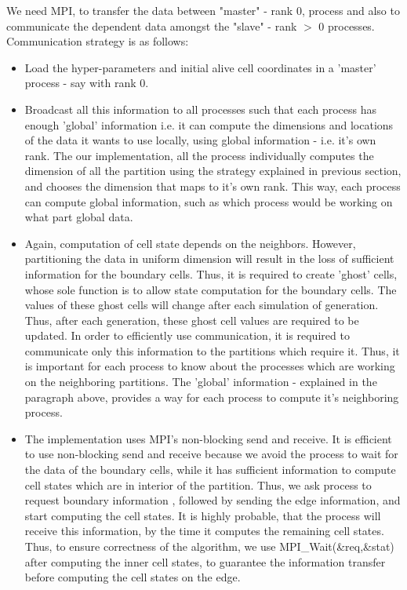 \documentclass[a4paper, 10pt, conference]{IEEEtran}      %
\begin{document}
	We need MPI, to transfer the data between "master" - rank 0, process and also to communicate the dependent data amongst the "slave" - rank $>$ 0 processes. Communication strategy is as follows:\\
	\begin{itemize}
		\item  Load the hyper-parameters and initial alive cell coordinates in a 'master' process - say with rank 0.\\
		\item Broadcast all this information to all processes such that each process has enough 'global' information i.e. it can compute the dimensions and locations of the data it wants to use locally, using global information - i.e. it's own rank.  The our implementation, all the process individually computes the dimension of all the partition using the strategy explained in previous section, and chooses the dimension that maps to it's own rank. This way, each process can compute global information, such as which process would be working on what part global data.\\
		\item Again, computation of cell state depends on the neighbors. However, partitioning the data in uniform dimension will result in the loss of sufficient information for the boundary cells. Thus, it is required to create 'ghost' cells, whose sole function is to allow state computation for the boundary cells. The values of these ghost cells will change after each simulation of generation. Thus, after each generation, these ghost cell values are required to be updated. In order to efficiently use communication, it is required to communicate only this information to the partitions which require it. Thus, it is important for each process to know about the processes which are working on the neighboring partitions. The 'global' information - explained in the paragraph above, provides a way for each process to compute it's neighboring process.\\
		\item The implementation uses MPI's non-blocking send and receive. It is efficient to use non-blocking send and receive because we avoid the process to wait for the data of the boundary cells, while it has sufficient information to compute cell states which are in interior of the partition. Thus, we ask process to request boundary information , followed by sending the edge information, and start computing the cell states. It is highly probable, that the process will receive this information, by the time it computes the remaining cell states. Thus, to ensure correctness of the algorithm, we use MPI\_Wait(\&req,\&stat) after computing the inner cell states, to guarantee the information transfer before computing the cell states on the edge. 
		
	\end{itemize}
\end{document}
